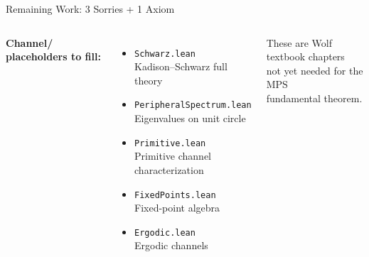 \documentclass[aspectratio=169,10pt]{beamer}
\begin{document}
\begin{frame}[fragile]{Remaining Work: 3 Sorries + 1 Axiom}
\begin{columns}[T]
        \textbf{\textcolor{leanblue}{Channel/ placeholders to fill:}}
        \begin{itemize}\itemsep0.15em\small
            \item[\textcolor{dimwhite}{$\diamond$}] \texttt{Schwarz.lean}\\
                  {\tiny Kadison--Schwarz full theory}
            \item[\textcolor{dimwhite}{$\diamond$}] \texttt{PeripheralSpectrum.lean}\\
                  {\tiny Eigenvalues on unit circle}
            \item[\textcolor{dimwhite}{$\diamond$}] \texttt{Primitive.lean}\\
                  {\tiny Primitive channel characterization}
            \item[\textcolor{dimwhite}{$\diamond$}] \texttt{FixedPoints.lean}\\
                  {\tiny Fixed-point algebra}
            \item[\textcolor{dimwhite}{$\diamond$}] \texttt{Ergodic.lean}\\
                  {\tiny Ergodic channels}
        \end{itemize}

        \vspace{0.3em}
        {\small These are Wolf textbook chapters\\
        not yet needed for the MPS\\
        fundamental theorem.}
    \end{columns}
\end{frame}
\end{document}

